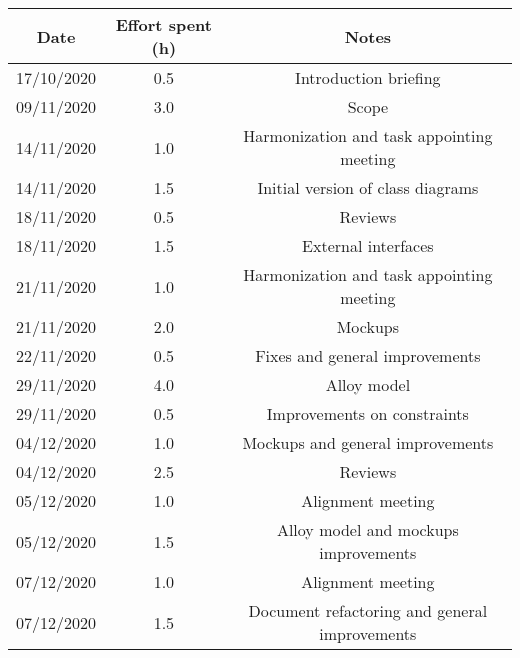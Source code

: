 \documentclass[../../main.tex]{subfiles}
\begin{document}
\begin{center}
    \begin{tabular}{|c| |c| |c|} 
        \hline
        Date & Effort spent (h) & Notes\\ [0.5ex] 
        \hline\hline
        17/10/2020 & 0.5 & Introduction briefing\\ 
        09/11/2020 & 3.0 & Scope\\ 
        14/11/2020 & 1.0 & Harmonization and task appointing meeting\\
        14/11/2020 & 1.5 & Initial version of class diagrams\\
        18/11/2020 & 0.5 & Reviews\\
        18/11/2020 & 1.5 & External interfaces\\
        21/11/2020 & 1.0 & Harmonization and task appointing meeting\\
        21/11/2020 & 2.0 & Mockups\\
        22/11/2020 & 0.5 & Fixes and general improvements\\
        29/11/2020 & 4.0 & Alloy model\\
        29/11/2020 & 0.5 & Improvements on constraints\\
        04/12/2020 & 1.0 & Mockups and general improvements\\
        04/12/2020 & 2.5 & Reviews\\
        05/12/2020 & 1.0 & Alignment meeting\\
        05/12/2020 & 1.5 & Alloy model and mockups improvements\\
        07/12/2020 & 1.0 & Alignment meeting\\
        07/12/2020 & 1.5 & Document refactoring and general improvements\\
        \hline
    \end{tabular}
\end{center}
\end{document}
